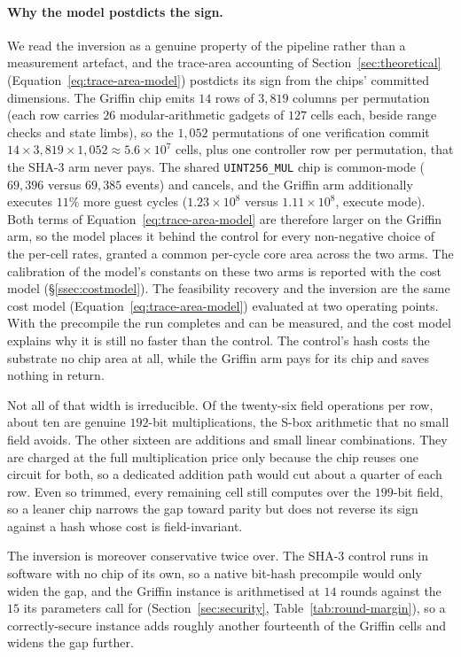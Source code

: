 \paragraph{Why the model postdicts the sign.}
We read the inversion as a genuine property of the pipeline rather than a measurement artefact, and the trace-area accounting of Section~\ref{sec:theoretical} (Equation~\eqref{eq:trace-area-model}) postdicts its sign from the chips' committed dimensions. The Griffin chip emits $14$ rows of $3{,}819$ columns per permutation (each row carries $26$ modular-arithmetic gadgets of $127$ cells each, beside range checks and state limbs), so the $1{,}052$ permutations of one verification commit $14\times 3{,}819\times 1{,}052\approx 5.6\times10^{7}$ cells, plus one controller row per permutation, that the SHA-3 arm never pays. The shared \texttt{UINT256\_MUL} chip is common-mode ($69{,}396$ versus $69{,}385$ events) and cancels, and the Griffin arm additionally executes $11\%$ more guest cycles ($1.23\times10^{8}$ versus $1.11\times10^{8}$, execute mode). Both terms of Equation~\eqref{eq:trace-area-model} are therefore larger on the Griffin arm, so the model places it behind the control for every non-negative choice of the per-cell rates, granted a common per-cycle core area across the two arms. The calibration of the model's constants on these two arms is reported with the cost model (\S\ref{ssec:costmodel}). The feasibility recovery and the inversion are the same cost model (Equation~\eqref{eq:trace-area-model}) evaluated at two operating points. With the precompile the run completes and can be measured, and the cost model explains why it is still no faster than the control. The control's hash costs the substrate no chip area at all, while the Griffin arm pays for its chip and saves nothing in return.

Not all of that width is irreducible. Of the twenty-six field operations per row, about ten are genuine $192$-bit multiplications, the S-box arithmetic that no small field avoids. The other sixteen are additions and small linear combinations. They are charged at the full multiplication price only because the chip reuses one circuit for both, so a dedicated addition path would cut about a quarter of each row. Even so trimmed, every remaining cell still computes over the $199$-bit field, so a leaner chip narrows the gap toward parity but does not reverse its sign against a hash whose cost is field-invariant.

The inversion is moreover conservative twice over. The SHA-3 control runs in software with no chip of its own, so a native bit-hash precompile would only widen the gap, and the Griffin instance is arithmetised at $14$ rounds against the $15$ its parameters call for (Section~\ref{sec:security}, Table~\ref{tab:round-margin}), so a correctly-secure instance adds roughly another fourteenth of the Griffin cells and widens the gap further.

